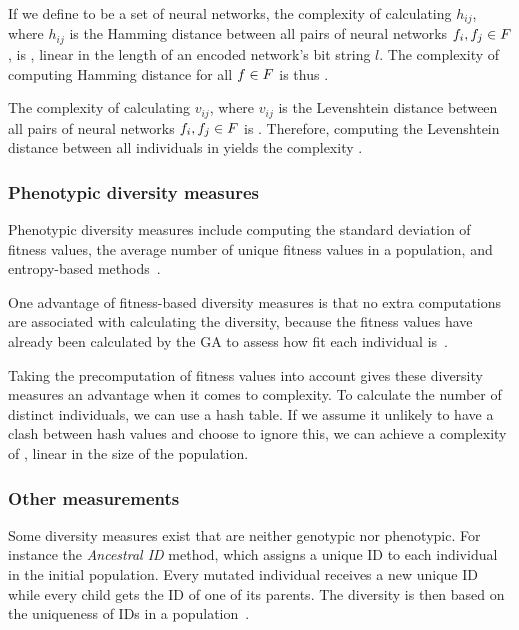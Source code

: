 If we define \indset{} to be a set of neural networks, the complexity of calculating $h_{ij}$, where $h_{ij}$ is the Hamming distance between all pairs of neural networks $f_i, f_j \in F$, is \bigO{\bitstringl}, linear in the length of an encoded network's bit string $l$. The complexity of computing Hamming distance for all $f \in F$ is thus \bigO{\indsetl^2 \cdot \bitstringl}. 

The complexity of calculating $v_{ij}$, where $v_{ij}$ is the Levenshtein distance between all pairs of neural networks $f_i, f_j \in F$ is \cite{Freeman:2006:CLN:1220835.1220895}. Therefore, computing the Levenshtein distance between all individuals in \indset{} yields the complexity .

\subsubsection{Phenotypic diversity measures}
Phenotypic diversity measures include computing the standard deviation of fitness values, the average number of unique fitness values in a population, and entropy-based methods~\cite{1250187, 1266373}.

One advantage of fitness-based diversity measures is that no extra computations are associated with calculating the diversity, because the fitness values have already been calculated by the GA to assess how fit each individual is~\cite{Nguyen:2006:ASPGP}.

Taking the precomputation of fitness values into account gives these diversity measures an advantage when it comes to complexity. To calculate the number of distinct individuals, we can use a hash table. If we assume it unlikely to have a clash between hash values and choose to ignore this, we can achieve a complexity of \bigO{\indsetl}, linear in the size of the population.

\subsubsection{Other measurements}
Some diversity measures exist that are neither genotypic nor phenotypic. For instance the \emph{Ancestral ID} method, which assigns a unique ID to each individual in the initial population. Every mutated individual receives a new unique ID while every child gets the ID of one of its parents. The diversity is then based on the uniqueness of IDs in a population~\cite{1250187}.

